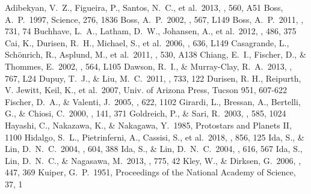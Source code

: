 \documentclass[twocolumn, dvipdfmx]{aastex62}
\begin{document}
\begin{CJK*}{UTF8}{min}
\acknowledgments


\vspace{5mm}


\begin{thebibliography}{}

 Adibekyan, V.~Z., Figueira, P., Santos, N.~C., et al.\ 2013, \aap, 560, A51
 Boss, A.~P.\ 1997, Science, 276, 1836
 Boss, A.~P.\ 2002, \apjl, 567, L149
 Boss, A.~P.\ 2011, \apj, 731, 74
 Buchhave, L.~A., Latham, D.~W., Johansen, A., et al.\ 2012, \nat, 486, 375
 Cai, K., Durisen, R.~H., Michael, S., et al.\ 2006, \apjl, 636, L149
 Casagrande, L., Sch{\"o}nrich, R., Asplund, M., et al.\ 2011, \aap, 530, A138
 Chiang, E.~I., Fischer, D., \& Thommes, E.\ 2002, \apjl, 564, L105
 Dawson, R.~I., \& Murray-Clay, R.~A.\ 2013, \apjl, 767, L24
 Dupuy, T.~J., \& Liu, M.~C.\ 2011, \apj, 733, 122
 Durisen, R. H., Reipurth, V. Jewitt, Keil, K., et al.\ 2007, Univ. of Arizona Press, Tucson 951, 607-622
 Fischer, D.~A., \& Valenti, J.\ 2005, \apj, 622, 1102
 Girardi, L., Bressan, A., Bertelli, G., \& Chiosi, C.\ 2000, \aaps, 141, 371
 Goldreich, P., \& Sari, R.\ 2003, \apj, 585, 1024
 Hayashi, C., Nakazawa, K., \& Nakagawa, Y.\ 1985, Protostars and Planets II, 1100
 Hidalgo, S.~L., Pietrinferni, A., Cassisi, S., et al.\ 2018, \apj, 856, 125
 Ida, S., \& Lin, D.~N.~C.\ 2004, \apj, 604, 388
 Ida, S., \& Lin, D.~N.~C.\ 2004, \apj, 616, 567
 Ida, S., Lin, D.~N.~C., \& Nagasawa, M.\ 2013, \apj, 775, 42
 Kley, W., \& Dirksen, G.\ 2006, \aap, 447, 369
 Kuiper, G.~P.\ 1951, Proceedings of the National Academy of Science, 37, 1

\end{thebibliography}
\end{CJK*}
\end{document}
